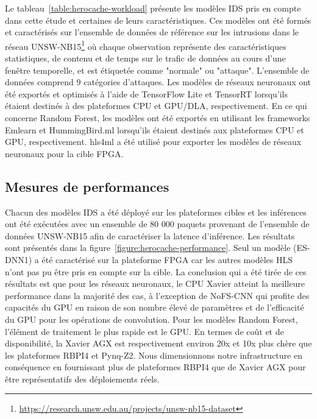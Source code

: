 Le tableau~\ref{table:herocache-workload} présente les modèles IDS pris en compte dans cette étude et certaines de leurs caractéristiques. Ces modèles ont été formés et caractérisés sur l'ensemble de données de référence sur les intrusions dans le réseau UNSW-NB15\footnote{\href{https://research.unsw.edu.au/projects/unsw-nb15-dataset}{https://research.unsw.edu.au/projects/unsw-nb15-dataset}}
où chaque observation représente des caractéristiques statistiques, de contenu et de temps sur le trafic de données au cours d'une fenêtre temporelle, et est étiquetée comme "normale" ou "attaque". L'ensemble de données comprend 9 catégories d'attaques. Les modèles de réseaux neuronaux ont été exportés et optimisés à l'aide de TensorFlow Lite et TensorRT lorsqu'ils étaient destinés à des plateformes CPU et GPU/DLA, respectivement. En ce qui concerne Random Forest, les modèles ont été exportés en utilisant les frameworks Emlearn et HummingBird.ml lorsqu'ils étaient destinés aux plateformes CPU et GPU, respectivement. hls4ml a été utilisé pour exporter les modèles de réseaux neuronaux pour la cible FPGA.

\subsection{Mesures de performances}

Chacun des modèles IDS a été déployé sur les plateformes cibles et les inférences ont été exécutées avec un ensemble de 80 000 paquets provenant de l'ensemble de données UNSW-NB15 afin de caractériser la latence d'inférence. Les résultats sont présentés dans la figure~\ref{figure:herocache-performance}. Seul un modèle (ES-DNN1) a été caractérisé sur la plateforme FPGA car les autres modèles HLS n'ont pas pu être pris en compte sur la cible. La conclusion qui a été tirée de ces résultats est que pour les réseaux neuronaux, le CPU Xavier atteint la meilleure performance dans la majorité des cas, à l'exception de NoFS-CNN qui profite des capacités du GPU en raison de son nombre élevé de paramètres et de l'efficacité du GPU pour les opérations de convolution. Pour les modèles Random Forest, l'élément de traitement le plus rapide est le GPU. En termes de coût et de disponibilité, la Xavier AGX est respectivement environ 20x et 10x plus chère que les plateformes RBPI4 et Pynq-Z2. Nous dimensionnons notre infrastructure en conséquence en fournissant plus de plateformes RBPI4 que de Xavier AGX pour être représentatifs des déploiements réels.

